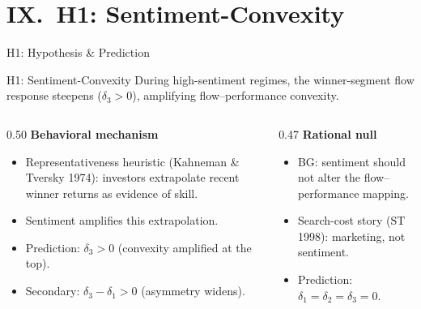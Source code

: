 \documentclass[10pt, aspectratio=169]{beamer}
\begin{document}
\section{IX.\ H1: Sentiment-Convexity}

\begin{frame}{H1: Hypothesis \& Prediction}
  \begin{block}{H1: Sentiment-Convexity}
    During high-sentiment regimes, the winner-segment flow response steepens
    ($\delta_3 > 0$), amplifying flow–performance convexity.
  \end{block}
  \vspace{4pt}
  \begin{columns}[T]
    \begin{column}{0.50\textwidth}
      \small\textbf{Behavioral mechanism}
      \begin{itemize}\itemsep3pt
        \item Representativeness heuristic (Kahneman \& Tversky 1974): investors
              extrapolate recent winner returns as evidence of skill.
        \item Sentiment amplifies this extrapolation.
        \item Prediction: $\delta_3 > 0$ (convexity amplified at the top).
        \item Secondary: $\delta_3 - \delta_1 > 0$ (asymmetry widens).
      \end{itemize}
    \end{column}
    \begin{column}{0.47\textwidth}
      \small\textbf{Rational null}
      \begin{itemize}\itemsep3pt
        \item BG: sentiment should not alter the flow–performance mapping.
        \item Search-cost story (ST 1998): marketing, not sentiment.
        \item Prediction: $\delta_1 = \delta_2 = \delta_3 = 0$.
      \end{itemize}
    \end{column}
  \end{columns}
\end{frame}
\end{document}
